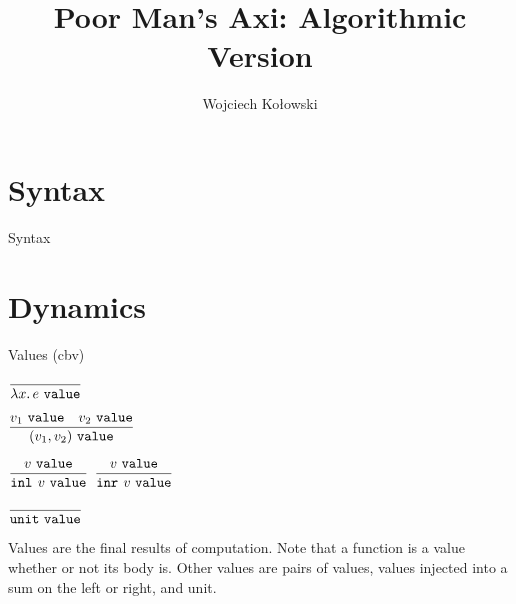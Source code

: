 \documentclass{beamer}
\title{Poor Man's Axi: Algorithmic Version}
\author{Wojciech Kołowski}
\date{}
\begin{document}
\frame{\titlepage}

\section{Syntax}

\begin{frame}{Syntax}

\end{frame}

\section{Dynamics}

\begin{frame}{Values (cbv)}

\begin{center}
  $\infrule{}{\val{\fun{x}{e}}}$

  \vspace{2em}

  $\displaystyle \frac{v_1\ \texttt{value} \quad v_2\ \texttt{value}}{(v_1, v_2)\ \texttt{value}} \textsc{\footnotesize{}}$

  \vspace{2em}

  $\displaystyle \frac{v\ \texttt{value}}{\texttt{inl}_{}\ v\ \texttt{value}} \textsc{\footnotesize{}}$ \quad
  $\displaystyle \frac{v\ \texttt{value}}{\texttt{inr}_{}\ v\ \texttt{value}} \textsc{\footnotesize{}}$ \quad

  \vspace{2em}

  $\displaystyle \frac{}{\texttt{unit}\ \texttt{value}} \textsc{\footnotesize{}}$
\end{center}

\vspace{2em}

Values are the final results of computation. Note that a function is a value whether or not its body is. Other values are pairs of values, values injected into a sum on the left or right, and unit.

\end{frame}
\end{document}
